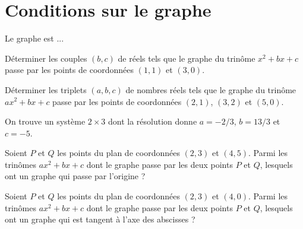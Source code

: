 \section{Conditions sur le graphe}

Le graphe est ...




\begin{exo}
Déterminer les couples $(b,c)$ de réels tels que le graphe du trinôme $x^2+bx+c$ passe par les points de coordonnées $(1,1)$ et $(3,0)$.
\begin{hint}
\end{hint}
\begin{sol}
\end{sol}
\end{exo}


\begin{exo}
Déterminer les triplets $(a,b,c)$ de nombres réels tels que le graphe du trinôme $ax^2+bx+c$ passe par les points de coordonnées $(2,1)$, $(3,2)$ et $(5,0)$.

\begin{hint}
\end{hint}
\begin{sol}
On trouve un système $2\times 3$ dont la résolution donne $a=-2/3$, $b=13/3$ et $c=-5$.
\end{sol}
\end{exo}

\begin{exo}
Soient $P$ et $Q$ les points du plan de coordonnées  $(2,3)$ et $(4,5)$.
Parmi les trinômes $ax^2+bx+c$ dont le graphe passe par les deux points $P$ et $Q$, lesquels ont un graphe qui passe par l'origine ?
\begin{hint}
\end{hint}
\begin{sol}
\end{sol}
\end{exo}

\begin{exo}
Soient $P$ et $Q$ les points du plan de coordonnées  $(2,3)$ et $(4,0)$.
Parmi les trinômes $ax^2+bx+c$ dont le graphe passe par les deux points $P$ et $Q$, lesquels ont un graphe qui est tangent à l'axe des abscisses ?
\begin{hint}
\end{hint}
\begin{sol}
\end{sol}
\end{exo}


